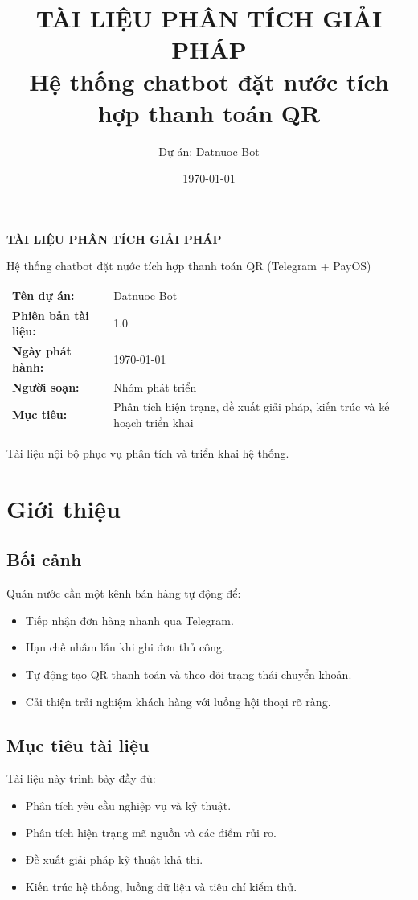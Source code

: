 \documentclass[12pt,a4paper]{article}
\title{\textbf{TÀI LIỆU PHÂN TÍCH GIẢI PHÁP}\\[0.3em]
\large Hệ thống chatbot đặt nước tích hợp thanh toán QR}
\author{Dự án: Datnuoc Bot}
\date{\today}
\begin{document}
\begin{titlepage}
    \centering
    {\Large \textbf{TÀI LIỆU PHÂN TÍCH GIẢI PHÁP} \par}
    \vspace{0.7cm}
    {\large Hệ thống chatbot đặt nước tích hợp thanh toán QR (Telegram + PayOS)\par}
    \vspace{1.2cm}

    \begin{tabular}{>{\bfseries}p{4cm}p{9cm}}
        Tên dự án: & Datnuoc Bot \\
        Phiên bản tài liệu: & 1.0 \\
        Ngày phát hành: & \today \\
        Người soạn: & Nhóm phát triển \\
        Mục tiêu: & Phân tích hiện trạng, đề xuất giải pháp, kiến trúc và kế hoạch triển khai \\
    \end{tabular}

    \vfill
    {\small Tài liệu nội bộ phục vụ phân tích và triển khai hệ thống.\par}
\end{titlepage}

\tableofcontents
\newpage

\section{Giới thiệu}
\subsection{Bối cảnh}
Quán nước cần một kênh bán hàng tự động để:
\begin{itemize}
    \item Tiếp nhận đơn hàng nhanh qua Telegram.
    \item Hạn chế nhầm lẫn khi ghi đơn thủ công.
    \item Tự động tạo QR thanh toán và theo dõi trạng thái chuyển khoản.
    \item Cải thiện trải nghiệm khách hàng với luồng hội thoại rõ ràng.
\end{itemize}

\subsection{Mục tiêu tài liệu}
Tài liệu này trình bày đầy đủ:
\begin{itemize}
    \item Phân tích yêu cầu nghiệp vụ và kỹ thuật.
    \item Phân tích hiện trạng mã nguồn và các điểm rủi ro.
    \item Đề xuất giải pháp kỹ thuật khả thi.
    \item Kiến trúc hệ thống, luồng dữ liệu và tiêu chí kiểm thử.
\end{itemize}
\end{document}
